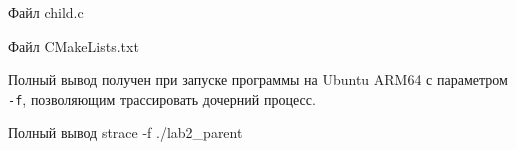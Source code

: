 \documentclass[12pt, a4paper]{article}
\begin{document}
\begin{listingblock}{Файл child.c}
\end{listingblock}

\begin{listingblock}{Файл CMakeLists.txt}
\end{listingblock}


Полный вывод получен при запуске программы на Ubuntu ARM64 с параметром
\texttt{-f}, позволяющим трассировать дочерний процесс.

\begin{listingblock}{Полный вывод strace -f ./lab2\_parent}
\end{listingblock}
\end{document}

